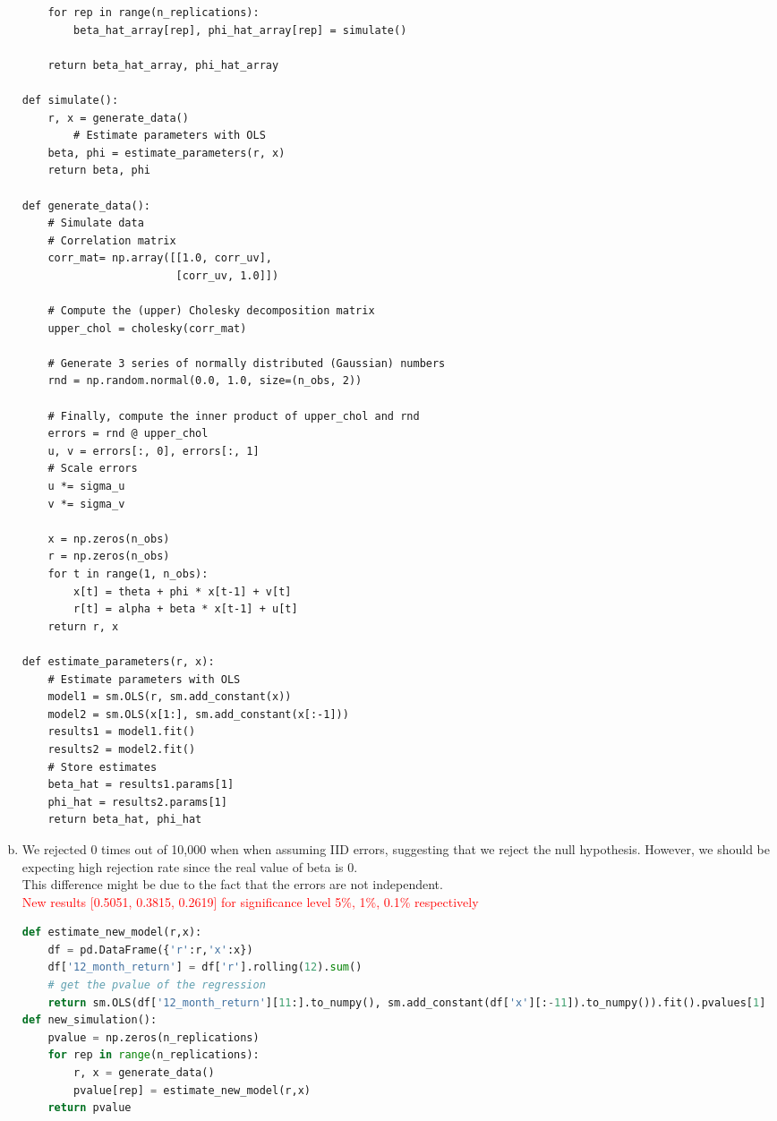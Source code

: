 \begin{enumerate}[(a)]
\begin{lstlisting}
    for rep in range(n_replications):
        beta_hat_array[rep], phi_hat_array[rep] = simulate()

    return beta_hat_array, phi_hat_array

def simulate():
    r, x = generate_data()
        # Estimate parameters with OLS
    beta, phi = estimate_parameters(r, x)
    return beta, phi

def generate_data():
    # Simulate data
    # Correlation matrix
    corr_mat= np.array([[1.0, corr_uv],
                        [corr_uv, 1.0]])

    # Compute the (upper) Cholesky decomposition matrix
    upper_chol = cholesky(corr_mat)

    # Generate 3 series of normally distributed (Gaussian) numbers
    rnd = np.random.normal(0.0, 1.0, size=(n_obs, 2))

    # Finally, compute the inner product of upper_chol and rnd
    errors = rnd @ upper_chol
    u, v = errors[:, 0], errors[:, 1]
    # Scale errors
    u *= sigma_u
    v *= sigma_v 

    x = np.zeros(n_obs)
    r = np.zeros(n_obs)
    for t in range(1, n_obs):
        x[t] = theta + phi * x[t-1] + v[t]
        r[t] = alpha + beta * x[t-1] + u[t]
    return r, x

def estimate_parameters(r, x):
    # Estimate parameters with OLS
    model1 = sm.OLS(r, sm.add_constant(x))
    model2 = sm.OLS(x[1:], sm.add_constant(x[:-1]))
    results1 = model1.fit()
    results2 = model2.fit()
    # Store estimates
    beta_hat = results1.params[1]
    phi_hat = results2.params[1]
    return beta_hat, phi_hat
\end{lstlisting}
\item 
We rejected 0 times out of 10,000 when when assuming IID errors, 
suggesting that we reject the null hypothesis. 
However, we should be expecting high rejection rate since the real value of beta is 0.\\
This difference might be due to the fact that the errors are not independent.\\
 \textcolor{red}{New results [0.5051, 0.3815, 0.2619] for significance level 5\%, 1\%, 0.1\% respectively}

\begin{lstlisting}[language=Python, caption=Python code for new model, label={lst:q1a}, escapechar=|, frame=single, basicstyle=\small, showstringspaces=false, captionpos=b, breaklines=true, showspaces=false, showtabs=false, keywordstyle=\color{blue}, commentstyle=\color{gray}]
    def estimate_new_model(r,x):
    df = pd.DataFrame({'r':r,'x':x})
    df['12_month_return'] = df['r'].rolling(12).sum()
    # get the pvalue of the regression
    return sm.OLS(df['12_month_return'][11:].to_numpy(), sm.add_constant(df['x'][:-11]).to_numpy()).fit().pvalues[1]
def new_simulation():
    pvalue = np.zeros(n_replications)
    for rep in range(n_replications):
        r, x = generate_data()
        pvalue[rep] = estimate_new_model(r,x)
    return pvalue
    \end{lstlisting}


\end{enumerate}
